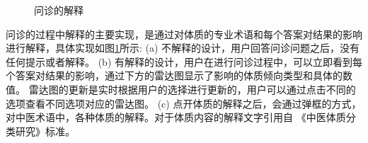 \begin{figure}[htbp]
    \caption{问诊的解释} 
    \label{fig:questions}
\end{figure}

问诊的过程中解释的主要实现，是通过对体质的专业术语和每个答案对结果的影响进行解释，具体实现如图\ref{fig:questions}所示:
(a) 不解释的设计，用户回答问诊问题之后，没有任何提示或者解释。
(b) 有解释的设计，用户在进行问诊过程中，可以立即看到每个答案对结果的影响，通过下方的雷达图显示了影响的体质倾向类型和具体的数值。
雷达图的更新是实时根据用户的选择进行更新的，用户可以通过点击不同的选项查看不同选项对应的雷达图。
(c) 点开体质的解释之后，会通过弹框的方式，对中医术语中，各种体质的解释。对于体质内容的解释文字引用自 《中医体质分类研究》标准。



